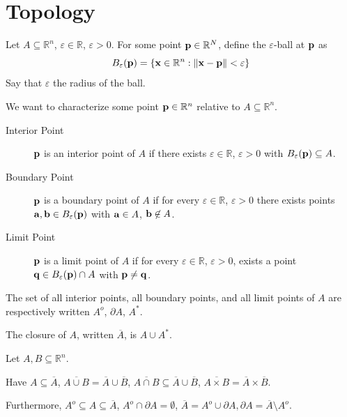 \section{Topology}

Let $A \subseteq \mathbb{R}^n$, $\varepsilon \in \mathbb{R}$, $\varepsilon > 0$. For some point $\mathbf{p} \in \mathbb{R}^N$, define the $\varepsilon$-ball at $\mathbf{p}$ as
\[
    B_\varepsilon(\mathbf{p}) = \{ \mathbf{x} \in \mathbb{R}^n : \lVert\mathbf{x} - \mathbf{p}\rVert < \varepsilon \}
\]
Say that $\varepsilon$ the radius of the ball.

We want to characterize some point $\mathbf{p} \in \mathbb{R}^n$ relative to $A \subseteq \mathbb{R}^n$.

\begin{definition}
    \leavevmode
    \begin{description}
        \item[Interior Point]
            $\mathbf{p}$ is an interior point of $A$ if there exists $\varepsilon \in \mathbb{R}$, $\varepsilon > 0$ with $B_\varepsilon(\mathbf{p}) \subseteq A$.

        \item[Boundary Point]
            $\mathbf{p}$ is a boundary point of $A$ if for every $\varepsilon \in \mathbb{R}$, $\varepsilon > 0$ there exists points $\mathbf{a}, \mathbf{b} \in B_\varepsilon(\mathbf{p})$ with $\mathbf{a} \in A$, $\mathbf{b} \not \in A$.

        \item[Limit Point]
            $\mathbf{p}$ is a limit point of $A$ if for every $\varepsilon \in \mathbb{R}$, $\varepsilon > 0$, exists a point $\mathbf{q} \in B_{\varepsilon}(\mathbf{p}) \cap A$ with $\mathbf{p} \ne \mathbf{q}$.
    \end{description}

    The set of all interior points, all boundary points, and all limit points of $A$ are respectively written $A^o$, $\partial A$, $A^*$.

    The closure of $A$, written $\overline{A}$, is $A \cup A^*$.

\end{definition}
\begin{theorem}
    Let $A, B \subseteq \mathbb{R}^n$.

    Have $A \subseteq \overline{A}$, $\overline{A \cup B} = \overline{A} \cup \overline{B}$, $\overline{A \cap B} \subseteq \overline{A} \cup \overline{B}$, $\overline{A \times B} = \overline{A} \times \overline{B}$.

    Furthermore, $A^o \subseteq A \subseteq \overline{A}$, $A^o \cap \partial A = \emptyset$, $\overline{A} = A^o \cup \partial A, \partial A = \overline{A} \setminus A^o$.
\end{theorem}
